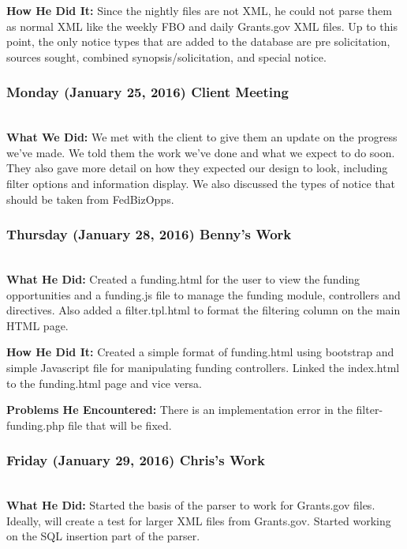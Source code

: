 \documentclass[onecolumn]{IEEEtran}
\begin{document}
	\textbf{How He Did It: }
	Since the nightly files are not XML, he could not parse them as normal XML like the weekly FBO and daily Grants.gov XML files. Up to this point, the only notice types that are added to the database are pre solicitation, sources sought, combined synopsis/solicitation, and special notice. 

\subsubsection{Monday (January 25, 2016) Client Meeting  } \hspace*{\fill} \\
    \textbf{What We Did: } 
    We met with the client to give them an update on the progress we've made. We told them the work we've done and what we expect to do soon. They also gave more detail on how they expected our design to look, including filter options and information display. We also discussed the types of notice that should be taken from FedBizOpps. 

\subsubsection{Thursday (January 28, 2016) Benny's Work  } \hspace*{\fill} \\
    \textbf{What He Did: } 
    Created a funding.html for the user to view the funding opportunities and a funding.js file to manage the funding module, controllers and directives. Also added a filter.tpl.html to format the filtering column on the main HTML page.  
    
	\textbf{How He Did It: }
	Created a simple format of funding.html using bootstrap and simple Javascript file for manipulating funding controllers. Linked the index.html to the funding.html page and vice versa. 
    
	\textbf{Problems He Encountered: }
	There is an implementation error in the filter-funding.php file that will be fixed. 

\subsubsection{Friday (January 29, 2016) Chris's Work  } \hspace*{\fill} \\
    \textbf{What He Did: } 
    Started the basis of the parser to work for Grants.gov files. Ideally, will create a test for larger XML files from Grants.gov. Started working on the SQL insertion part of the parser. 
    
\end{document}
